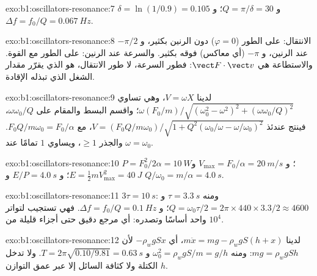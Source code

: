 \begin{solution}{exo:b1:oscillators-resonance:7}
$\delta = \ln(1/0.9) = 0.105$ و $Q = \pi/\delta = 30$؛ و $\Delta f = f_0/Q =
\qty{0.067}{Hz}$.
\end{solution}

\begin{solution}{exo:b1:oscillators-resonance:8}
الانتقال: على الطور ($\varphi = 0$) دون الرنين بكثير، و $-\pi/2$ عند
الرنين، و $-\pi$ (أي معاكس) فوقه بكثير. والسرعة عند الرنين: على
الطور مع القوة. والاستطاعة هي $\vect F\cdot\vect v$: فطور السرعة،
لا طور الانتقال، هو الذي يقرّر مقدار الشغل الذي تبذله
الإقادة.
\end{solution}

\begin{solution}{exo:b1:oscillators-resonance:9}
لدينا $V = \omega X$، وهي تساوي
$\omega(F_0/m)/\sqrt{(\omega_0^2 - \omega^2)^2 + (\omega\omega_0/Q)^2}$؛
واقسم البسط والمقام على $\omega\omega_0/Q$، فينتج عندئذ
$V = (F_0Q/m\omega_0)/\sqrt{1 + Q^2(\omega_0/\omega - \omega/\omega_0)^2}$، مع $F_0Q/m\omega_0 = F_0/\alpha$.
والجذر $\geq 1$، ويساوي $1$ تمامًا عند $\omega = \omega_0$.
\end{solution}

\begin{solution}{exo:b1:oscillators-resonance:10}
$P = F_0^2/2\alpha = \qty{10}{W}$؛ و $V_{\max} = F_0/\alpha = \qty{20}{m/s}$ و
$E = \tfrac12 mV_{\max}^2 = \qty{40}{J}$؛ و $E/P = \qty{4.0}{s}$ و $Q/\omega_0 =
m/\alpha = \qty{4.0}{s}$.
\end{solution}

\begin{solution}{exo:b1:oscillators-resonance:11}
$3\tau = \qty{10}{s}$: ومنه $\tau = \qty{3.3}{s}$ و $Q = \omega_0\tau/2 = 2\pi \times
440 \times 3.3/2 \approx 4600$؛ و $\Delta f = f_0/Q = \qty{0.1}{Hz}$. فهي
تستجيب لتواتر واحد أساسًا وتصدره: أي مرجع دقيق حتى
أجزاء قليلة من $10^4$.
\end{solution}

\begin{solution}{exo:b1:oscillators-resonance:12}
لدينا $m\ddot x = mg - \rho_wgS(h + x)$، أي $-\rho_wgSx$ لأن
$mg = \rho_wgSh$:
ومنه $\omega_0^2 = \rho_wgS/m = g/h$ و $T = 2\pi\sqrt{0.10/9.81} = \qty{0.63}{s}$.
ولا تدخل الكتلة ولا كثافة السائل إلا عبر
عمق التوازن $h$.
\end{solution}

